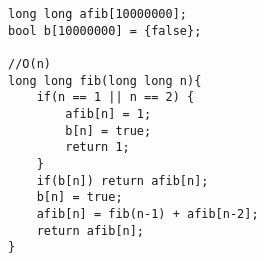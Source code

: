 \begin{verbatim}
long long afib[10000000];
bool b[10000000] = {false};

//O(n)
long long fib(long long n){
	if(n == 1 || n == 2) {
		afib[n] = 1;
		b[n] = true;
		return 1;
	}
	if(b[n]) return afib[n];
	b[n] = true;
	afib[n] = fib(n-1) + afib[n-2];
	return afib[n];
}
\end{verbatim}